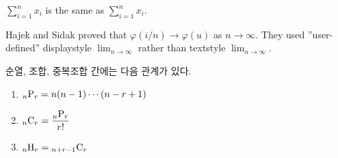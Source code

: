 \documentclass[11pt]{article}
\newcommand{\dsum}[2]{\displaystyle \sum_{#1}^{#2}}
\newcommand{\vphi}{\varphi}
\newcommand{\go}{\longrightarrow}
\newcommand{\dlim}[1]{{\displaystyle \lim_{#1}}}
\newcommand{\harcombi}[2]{{}_{#1}{\rm H}_{#2}}
\newcommand{\permut}[2]{{}_{#1}{\rm P}_{#2}}
\newcommand{\combi}[2]{{}_{#1}{\rm C}_{#2}}
\begin{document}
$\dsum{i=1}{n} x_i$ is the same as $\sum_{i=1}^n x_i$.

Hajek and Sidak proved that $\vphi (i/n)\go \vphi(u)$ as $n\go\infty$. They used  ''user-defined'' displaystyle $\dlim{n\go\infty}$ rather than textstyle $\lim_{n\go\infty}$.

순열, 조합, 중복조합 간에는 다음 관계가 있다.
\begin{enumerate}
\item $\permut{n}{r}=n(n-1)\cdots(n-r+1)$
\item $\combi{n}{r}={\displaystyle \frac{\permut{n}{r}}{r!}}$
\item $\harcombi{n}{r}=\combi{n+r-1}{r}$
\end{enumerate}
\end{document}
